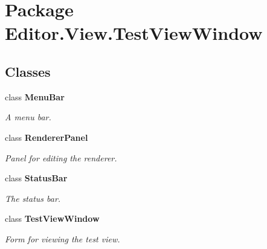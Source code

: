 \section{Package Editor.\-View.\-Test\-View\-Window}
\label{namespace_editor_1_1_view_1_1_test_view_window}
\subsection*{Classes}
\begin{DoxyCompactItemize}
\item 
class {\bf Menu\-Bar}
\begin{DoxyCompactList}\small\item\em A menu bar. \end{DoxyCompactList}\item 
class {\bf Renderer\-Panel}
\begin{DoxyCompactList}\small\item\em Panel for editing the renderer. \end{DoxyCompactList}\item 
class {\bf Status\-Bar}
\begin{DoxyCompactList}\small\item\em The status bar. \end{DoxyCompactList}\item 
class {\bf Test\-View\-Window}
\begin{DoxyCompactList}\small\item\em Form for viewing the test view. \end{DoxyCompactList}\end{DoxyCompactItemize}

